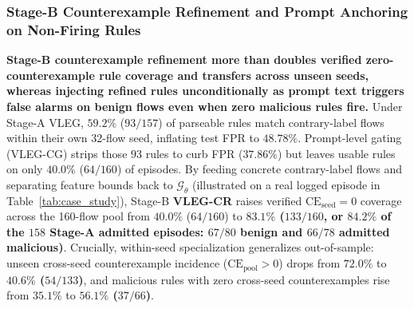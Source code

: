 \documentclass[11pt,letterpaper,onecolumn]{article}
\begin{document}
\subsubsection{Stage-B Counterexample Refinement and Prompt Anchoring on Non-Firing Rules}
\textbf{Stage-B counterexample refinement more than doubles verified zero-counterexample rule coverage and transfers across unseen seeds, whereas injecting refined rules unconditionally as prompt text triggers false alarms on benign flows even when zero malicious rules fire.} Under Stage-A VLEG, $59.2\%$ ($93/157$) of parseable rules match contrary-label flows within their own 32-flow seed, inflating test FPR to $48.78\%$. Prompt-level gating (VLEG-CG) strips those $93$ rules to curb FPR ($37.86\%$) but leaves usable rules on only $40.0\%$ ($64/160$) of episodes. By feeding concrete contrary-label flows and separating feature bounds back to $\mathcal{G}_\theta$ (illustrated on a real logged episode in Table~\ref{tab:case_study}), Stage-B \textbf{VLEG-CR} raises verified $\mathrm{CE}_{\mathrm{seed}}=0$ coverage across the 160-flow pool from $40.0\%$ ($64/160$) to \textbf{$83.1\%$ ($133/160$, or $84.2\%$ of the $158$ Stage-A admitted episodes: $67/80$ benign and $66/78$ admitted malicious)}. Crucially, within-seed specialization generalizes out-of-sample: unseen cross-seed counterexample incidence ($\mathrm{CE}_{\mathrm{pool}}>0$) drops from $72.0\%$ to \textbf{$40.6\%$ ($54/133$)}, and malicious rules with zero cross-seed counterexamples rise from $35.1\%$ to \textbf{$56.1\%$ ($37/66$)}.
\end{document}
